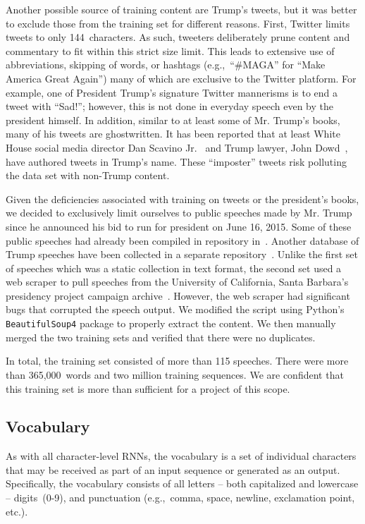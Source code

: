 \documentclass{article}
\begin{document}
Another possible source of training content are Trump's tweets, but it was better to exclude those from the training set for different reasons.  First, Twitter limits tweets to only 144~characters. As such, tweeters deliberately prune content and commentary to fit within this strict size limit.  This leads to extensive use of abbreviations, skipping of words, or hashtags (e.g.,~``\#MAGA'' for ``Make America Great Again'') many of which are exclusive to the Twitter platform. For example, one of President Trump's signature Twitter mannerisms is to end a tweet with ``Sad!''; however, this is not done in everyday speech even by the president himself. In addition, similar to at least some of Mr. Trump's books, many of his tweets are ghostwritten.  It has been reported that at least White House social media director Dan Scavino Jr.~\cite{ohlheiser2017} and Trump lawyer, John Dowd~\cite{phillipsBlake2017}, have authored tweets in Trump's name.  These ``imposter'' tweets risk polluting the data set with non-Trump content.

Given the deficiencies associated with training on tweets or the president's books, we decided to exclusively limit ourselves to public speeches made by Mr. Trump since he announced his bid to run for president on June 16, 2015.  Some of these public speeches had already been compiled in repository in~\cite{ryanMcdermottTrumpSpeeches}.  Another database of Trump speeches have been collected in a separate repository~\cite{pedramNavidTrumpSpeeches}.  Unlike the first set of speeches which was a static collection in text format, the second set used a web scraper to pull speeches from the University of California, Santa Barbara's presidency project campaign archive~\cite{americanPresidencyProject}.  However, the web scraper had significant bugs that corrupted the speech output.  We modified the script using Python's \texttt{BeautifulSoup4} package to properly extract the content.  We then manually merged the two training sets and verified that there were no duplicates.

In total, the training set consisted of more than 115 speeches.  There were more than 365,000~words and two million training sequences.  We are confident that this training set is more than sufficient for a project of this scope.

\subsection{Vocabulary}

As with all character-level RNNs, the vocabulary is a set of individual characters that may be received as part of an input sequence or generated as an output.  Specifically, the vocabulary consists of all letters -- both capitalized and lowercase -- digits~(0-9), and punctuation (e.g.,~comma, space, newline, exclamation point, etc.).
\end{document}

